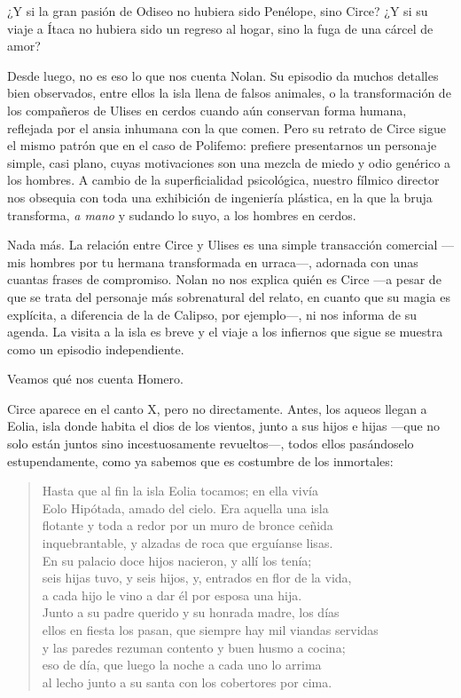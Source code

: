 
¿Y si la gran pasión de Odiseo no hubiera sido Penélope, sino Circe? ¿Y si su viaje a Ítaca no hubiera sido un regreso al hogar, sino la fuga de una cárcel de amor?

Desde luego, no es eso lo que nos cuenta Nolan. Su episodio da muchos detalles bien observados, entre ellos la isla llena de falsos animales, o la transformación de los compañeros de Ulises en cerdos cuando aún conservan forma humana, reflejada por el ansia inhumana con la que comen. Pero su retrato de Circe sigue el mismo patrón que en el caso de Polifemo: prefiere presentarnos un personaje simple, casi plano, cuyas motivaciones son una mezcla de miedo y odio genérico a los hombres. A cambio de la superficialidad psicológica, nuestro fílmico director nos obsequia con toda una exhibición de ingeniería plástica, en la que la bruja transforma, \emph{a mano} y sudando lo suyo, a los hombres en cerdos.

Nada más. La relación entre Circe y Ulises es una simple transacción comercial ---mis hombres por tu hermana transformada en urraca---, adornada con unas cuantas frases de compromiso. Nolan no nos explica quién es Circe ---a pesar de que se trata del personaje más sobrenatural del relato, en cuanto que su magia es explícita, a diferencia de la de Calipso, por ejemplo---, ni nos informa de su agenda. La visita a la isla es breve y el viaje a los infiernos que sigue se muestra como un episodio independiente.

Veamos qué nos cuenta Homero.

Circe aparece en el canto X, pero no directamente. Antes, los aqueos llegan a Eolia, isla donde habita el dios de los vientos, junto a sus hijos e hijas ---que no solo están juntos sino incestuosamente revueltos---, todos ellos pasándoselo estupendamente, como ya sabemos que es costumbre de los inmortales:

\begin{verse}
Hasta que al fin la isla Eolia tocamos; en ella vivía\\
Eolo Hipótada, amado del cielo. Era aquella una isla\\
flotante y toda a redor por un muro de bronce ceñida\\
inquebrantable, y alzadas de roca que erguíanse lisas.\\
En su palacio doce hijos nacieron, y allí los tenía;\\
seis hijas tuvo, y seis hijos, y, entrados en flor de la vida,\\
a cada hijo le vino a dar él por esposa una hija.\\
Junto a su padre querido y su honrada madre, los días\\
ellos en fiesta los pasan, que siempre hay mil viandas servidas\\
y las paredes rezuman contento y buen husmo a cocina;\\
eso de día, que luego la noche a cada uno lo arrima\\
al lecho junto a su santa con los cobertores por cima.
\end{verse}

